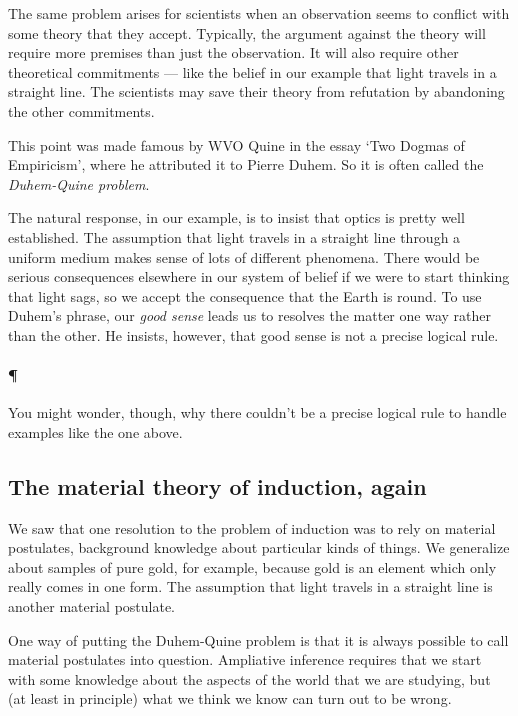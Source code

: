 \documentclass[]{article}
\newcommand*{\newbit}{\paragraph{\P}}
\begin{document}
The same problem arises for scientists when an observation seems to conflict with some theory that they accept. Typically, the argument against the theory will require more premises than just the observation. It will also require other theoretical commitments --- like the belief in our example that light travels in a straight line. The scientists may save their theory from refutation by abandoning the other commitments.

This point was made famous by WVO Quine in the essay `Two Dogmas of Empiricism', where he attributed it to Pierre Duhem. So it is often called the \emph{Duhem-Quine problem}. 

The natural response, in our example, is to insist that optics is pretty well established. The assumption that light travels in a straight line through a uniform medium makes sense of lots of different phenomena. There would be serious consequences elsewhere in our system of belief if we were to start thinking that light sags, so we accept the consequence that the Earth is round. To use Duhem's phrase, our \emph{good sense} leads us to resolves the matter one way rather than the other. He insists, however, that good sense is not a precise logical rule.

\newbit You might wonder, though, why there couldn't be a precise logical rule to handle examples like the one above.



\subsection{The material theory of induction, again}

We saw that one resolution to the problem of induction was to rely on material postulates, background knowledge about particular kinds of things. We generalize about samples of pure gold, for example, because gold is an element which only really comes in one form. The assumption that light travels in a straight line is another material postulate.

One way of putting the Duhem-Quine problem is that it is always possible to call material postulates into question. Ampliative inference requires that we start with some knowledge about the aspects of the world that we are studying, but (at least in principle) what we think we know can turn out to be wrong.



\label{theend}
\end{document}
